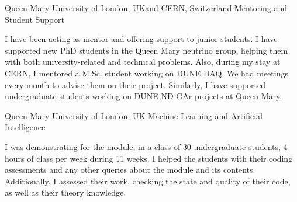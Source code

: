 	{%
		Queen Mary University of London, UK\newline \hfill and
		CERN, Switzerland}
	{%
		Mentoring and Student Support}
	{%
		\begin{justify}\noindent
			I have been acting as mentor and offering support to junior students. I have supported new PhD students in the Queen Mary neutrino group, helping them with both university-related and technical problems. Also, during my stay at CERN, I mentored a M.Sc. student working on DUNE DAQ. We had meetings every month to advise them on their project. Similarly, I have supported undergraduate students working on DUNE ND-GAr projects at Queen Mary.
		\end{justify}
	}

	{%
		Queen Mary University of London, UK}
	{%
		Machine Learning and Artificial Intelligence}
	{%
		\begin{justify}\noindent
			I was demonstrating for the module, in a class of 30 undergraduate students, 4 hours of class per week during 11 weeks. I helped the students with their coding assessments and any other queries about the module and its contents. Additionally, I assessed their work, checking the state and quality of their code, as well as their theory knowledge.
		\end{justify}
	}
